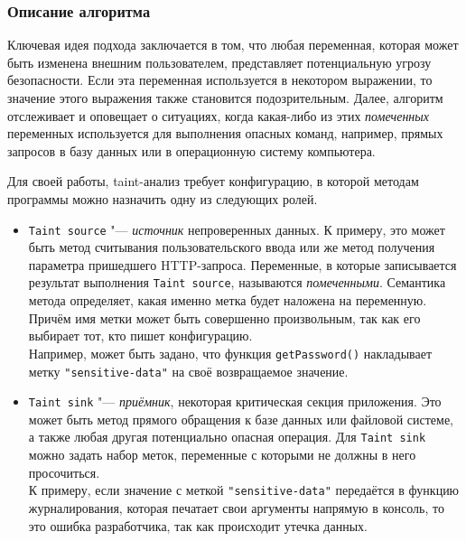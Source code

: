 \subsubsection{Описание алгоритма}

Ключевая идея подхода заключается в том, что любая переменная, которая может быть изменена внешним пользователем, представляет потенциальную угрозу безопасности. Если эта переменная используется в некотором выражении, то значение этого выражения также становится подозрительным. Далее, алгоритм отслеживает и оповещает о ситуациях, когда какая-либо из этих \textit{помеченных} переменных используется для выполнения опасных команд, например, прямых запросов в базу данных или в операционную систему компьютера.

Для своей работы, taint-анализ требует конфигурацию, в которой методам программы можно назначить одну из следующих ролей.

\begin{itemize}
    \item \verb|Taint source| "--- \textit{источник} непроверенных данных. К примеру, это может быть метод считывания пользовательского ввода или же метод получения параметра пришедшего HTTP-запроса. Переменные, в которые записывается результат выполнения \verb|Taint source|, называются \textit{помеченными}. Семантика метода определяет, какая именно метка будет наложена на переменную. Причём имя метки может быть совершенно произвольным, так как его выбирает тот, кто пишет конфигурацию. \\
    Например, может быть задано, что функция \verb|getPassword()| накладывает метку \verb|"sensitive-data"| на своё возвращаемое значение.
    \item \verb|Taint sink| "--- \textit{приёмник}, некоторая критическая секция приложения. Это может быть метод прямого обращения к базе данных или файловой системе, а также любая другая потенциально опасная операция. Для \verb|Taint sink| можно задать набор меток, переменные с которыми не должны в него просочиться. \\
    К примеру, если значение с меткой \verb|"sensitive-data"| передаётся в функцию журналирования, которая печатает свои аргументы напрямую в консоль, то это ошибка разработчика, так как происходит утечка данных.
\end{itemize}

